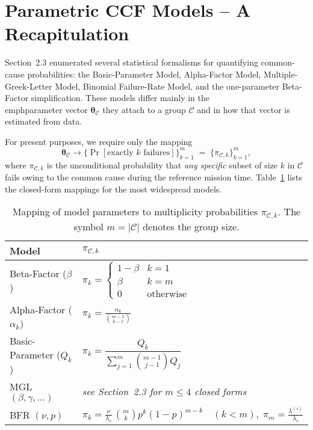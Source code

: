 \section{Parametric CCF Models – A Recapitulation}
\label{sec:ccf_models_recap}

Section~2.3 enumerated several statistical formalisms for quantifying common-
cause probabilities: the Basic-Parameter Model, Alpha-Factor Model, Multiple-
Greek-Letter Model, Binomial Failure-Rate Model, and the one-parameter
Beta-Factor simplification.  These models differ mainly in the \\emph{parameter
vector}
\(\boldsymbol{\theta}_{\!\mathcal{C}}\) they attach to a group
\(\mathcal{C}\) and in how that vector is estimated from data.

For present purposes, we require only the mapping
\[\boldsymbol{\theta}_{\!\mathcal{C} } \longrightarrow
  \bigl\{\Pr[\text{exactly }k\text{ failures}]\bigr\}_{k=1}^{m}
  \;=\; \{\pi_{\mathcal{C},k}\}_{k=1}^{m} ,\]
where \(\pi_{\mathcal{C},k}\) is the unconditional probability that \emph{any
specific} subset of size \(k\) in \(\mathcal{C}\) fails owing to the common
cause during the reference mission time.  Table~\ref{tab:ccf_model_mapping}
lists the closed-form mappings for the most widespread models.

\begin{table}[t]
  \centering
  \caption{Mapping of model parameters to multiplicity probabilities
           \(\pi_{\mathcal{C},k}\).  The symbol \(m=|\mathcal{C}|\) denotes
           the group size.}
  \label{tab:ccf_model_mapping}
  \begin{tabular}{l@{\qquad}l}
    \toprule
    Model & $\pi_{\mathcal{C},k}$\\
    \midrule
    Beta-Factor ($\beta$) & $\pi_{k}=\begin{cases}
        1-\beta & k=1\\[4pt]
        \beta & k=m\\[2pt]
        0 & \text{otherwise}
      \end{cases}$\\[8pt]
    Alpha-Factor ($\alpha_k$) & $\displaystyle
      \pi_{k}=\frac{\alpha_k}{\binom{m-1}{k-1}}$\\[10pt]
    Basic-Parameter ($Q_k$) & $\pi_{k}=\dfrac{Q_k}{\sum_{j=1}^{m} \binom{m-1}{j-1}Q_j}$\\[10pt]
    MGL $(\beta,\gamma,\dots)$ & \emph{see Section~2.3 for $m\le 4$ closed forms}\\[8pt]
    BFR $(\nu,p)$ & $\displaystyle
      \pi_{k}= \frac{\nu}{\lambda_{c}}\, \binom{m}{k} p^{k}(1-p)^{m-k}
      \quad (k<m), \; \pi_{m}=\frac{\lambda^{(i)}}{\lambda_{c}}$\\
    \bottomrule
  \end{tabular}
\end{table}

